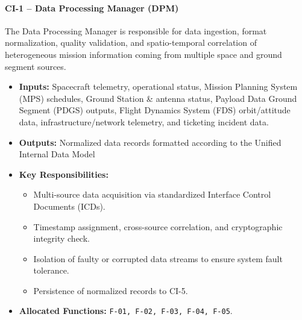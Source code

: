 \paragraph{CI-1 -- Data Processing Manager (DPM)}
The Data Processing Manager is responsible for data ingestion, format normalization, quality validation, and spatio-temporal correlation of heterogeneous mission information coming from multiple space and ground segment sources.
\begin{itemize}
    \item \textbf{Inputs:} Spacecraft telemetry, operational status, Mission Planning System (MPS) schedules, Ground Station \& antenna status, Payload Data Ground Segment (PDGS) outputs, Flight Dynamics System (FDS) orbit/attitude data, infrastructure/network telemetry, and ticketing incident data.
    \item \textbf{Outputs:} Normalized data records formatted according to the Unified Internal Data Model
    \item \textbf{Key Responsibilities:}
    \begin{itemize}
        \item Multi-source data acquisition via standardized Interface Control Documents (ICDs).
        \item Timestamp assignment, cross-source correlation, and cryptographic integrity check.
        \item Isolation of faulty or corrupted data streams to ensure system fault tolerance.
        \item Persistence of normalized records to CI-5.
    \end{itemize}
    \item \textbf{Allocated Functions:} \texttt{F-01, F-02, F-03, F-04, F-05}.
\end{itemize}

